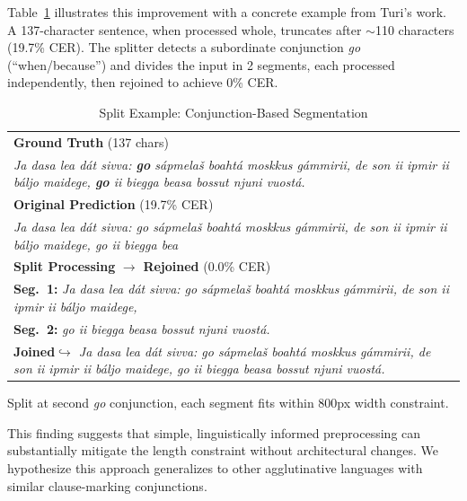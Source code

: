 \documentclass[conference]{IEEEtran}
\begin{document}
Table~\ref{tab:split_example} illustrates this improvement with a concrete example from Turi's work. A 137-character sentence, when processed whole, truncates after $\sim$110 characters (19.7\% CER). The splitter detects a subordinate conjunction \textit{go} (``when/because'') and divides the input in 2 segments, each processed independently, then rejoined to achieve 0\% CER.

\begin{table}[tb]
\centering
\caption{\footnotesize Split Example: Conjunction-Based Segmentation}
\label{tab:split_example}
\small
\begin{tabular}{@{}p{}@{}}
\toprule
\textbf{Ground Truth} (137 chars) \\
\textit{Ja dasa lea d\'{a}t sivva: \textbf{go} s\'{a}pmela\v{s} boaht\'{a} moskkus g\'{a}mmirii, de son ii ipmir ii b\'{a}ljo maidege, \textbf{go} ii biegga beasa bossut njuni vuost\'{a}.} \\
\midrule
\textbf{Original Prediction} (19.7\% CER) \\
\textit{Ja dasa lea d\'{a}t sivva: go s\'{a}pmela\v{s} boaht\'{a} moskkus g\'{a}mmirii, de son ii ipmir ii b\'{a}ljo maidege, go ii biegga bea}\\
\midrule
\textbf{Split Processing} $\rightarrow$ \textbf{Rejoined} (0.0\% CER) \\
\textbf{Seg.\ 1:} \textit{Ja dasa lea d\'{a}t sivva: go s\'{a}pmela\v{s} boaht\'{a} moskkus g\'{a}mmirii, de son ii ipmir ii b\'{a}ljo maidege,} \\
\textbf{Seg.\ 2:} \textit{go ii biegga beasa bossut njuni vuost\'{a}.} \\
\textbf{Joined}\textit{$\hookrightarrow$ Ja dasa lea d\'{a}t sivva: go s\'{a}pmela\v{s} boaht\'{a} moskkus g\'{a}mmirii, de son ii ipmir ii b\'{a}ljo maidege, go ii biegga beasa bossut njuni vuost\'{a}.} \\
\bottomrule
\end{tabular}
\vspace{0.2em}
\footnotesize{Split at second \textit{go} conjunction, each segment fits within 800px width constraint.}
\end{table}

This finding suggests that simple, linguistically informed preprocessing can substantially mitigate the length constraint without architectural changes. We hypothesize this approach generalizes to other agglutinative languages with similar clause-marking conjunctions.
\end{document}
